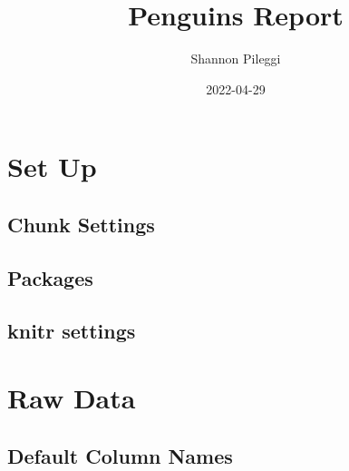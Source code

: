 \documentclass[
  landscape]{article}
\title{Penguins Report}
\author{Shannon Pileggi}
\date{2022-04-29}
\begin{document}
\maketitle

\newpage{}

{
\setcounter{tocdepth}{2}
\tableofcontents
}
\let\oldsection\section
\renewcommand\section{\clearpage\oldsection}

\hypertarget{set-up}{%
\section{Set Up}\label{set-up}}

\hypertarget{chunk-settings}{%
\subsection{Chunk Settings}\label{chunk-settings}}

\hypertarget{packages}{%
\subsection{Packages}\label{packages}}

\hypertarget{knitr-settings}{%
\subsection{knitr settings}\label{knitr-settings}}

\hypertarget{raw-data}{%
\section{Raw Data}\label{raw-data}}

\hypertarget{default-column-names}{%
\subsection{Default Column Names}\label{default-column-names}}
\end{document}
